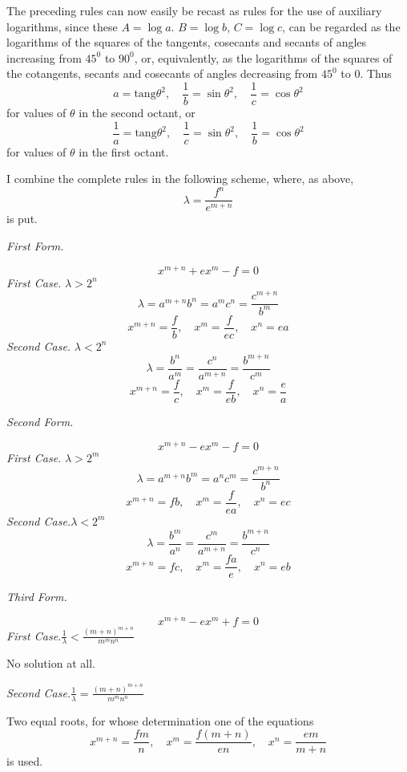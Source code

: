 The preceding rules can now easily be recast as rules for the use of auxiliary logarithms, since these $A=\log a$.
$B=\log b$, $C=\log c$, can be regarded as the logarithms of the squares of the tangents, cosecants and secants of angles increasing from $45^0$ to $90^0$, or, equivalently, as the logarithms of the squares of the cotangents,
secants and cosecants of angles decreasing from $45^0$ to $0$. Thus
\[
a=\mathrm{tang}\theta^2,\quad \frac{1}{b}=\sin\theta^2,\quad
\frac{1}{c}=\cos\theta^2
\]
for values of $\theta$ in the second octant, or
\[
\frac{1}{a}=\mathrm{tang}\theta^2,\quad
\frac{1}{c}=\sin\theta^2,\quad
\frac{1}{b}=\cos\theta^2
\]
for values of $\theta$ in the first octant.

I combine the complete rules in the following scheme, where, as above,
\[
\lambda=\frac{f^n}{e^{m+n}}
\]
is put.

\begin{center}\textit{First Form.}\end{center}
\[
x^{m+n}+ex^m-f=0
\]
\textit{First Case.} $\lambda>2^n$
\[
\lambda=a^{m+n}b^n=a^m c^n=\frac{c^{m+n}}{b^m}
\]
\[
x^{m+n}=\frac{f}{b},\quad x^m=\frac{f}{ec},\quad x^n=ea
\]
\textit{Second Case.} $\lambda<2^n$
\[
\lambda=\frac{b^n}{a^m}=\frac{c^n}{a^{m+n}}=\frac{b^{m+n}}{c^m}
\]
\[
x^{m+n}=\frac{f}{c},\quad x^m=\frac{f}{eb},\quad x^n=\frac{e}{a}
\]

\begin{center}\textit{Second Form.}\end{center}
\[
x^{m+n}-ex^m-f=0
\]
\textit{First Case.} $\lambda>2^m$
\[
\lambda=a^{m+n}b^m=a^nc^m=\frac{c^{m+n}}{b^n}
\]
\[
x^{m+n}=fb,\quad x^m=\frac{f}{ea},\quad x^n=ec
\]
\textit{Second Case.}\quad $\lambda<2^m$
\[
\lambda=\frac{b^m}{a^n}=\frac{c^m}{a^{m+n}}=\frac{b^{m+n}}{c^n}
\]
\[
x^{m+n}=fc,\quad x^m=\frac{fa}{e},\quad x^n=eb
\]
\begin{center}\textit{Third Form.}\end{center}
\[
x^{m+n}-ex^m+f=0
\]
\textit{First Case.}\quad $\frac{1}{\lambda}<\frac{(m+n)^{m+n}}{m^mn^n}$

No solution at all.

\textit{Second Case.}\quad $\frac{1}{\lambda}=\frac{(m+n)^{m+n}}{m^mn^n}$

Two equal roots, for whose determination one of the equations
\[
x^{m+n}=\frac{fm}{n},\quad x^m=\frac{f(m+n)}{en},\quad x^n=\frac{em}{m+n}
\]
is used.

